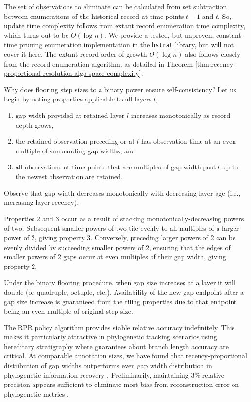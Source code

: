The set of observations to eliminate can be calculated from set subtraction between enumerations of the historical record at time points $t-1$ and $t$.
So, update time complexity follows from extant record enumeration time complexity, which turns out to be $O(\log n)$.
We provide a tested, but unproven, constant-time pruning enumeration implementation in the \texttt{hstrat} library, but will not cover it here. %
The extant record order of growth $O(\log n)$ also follows closely from the record enumeration algorithm, as detailed in Theorem \ref{thm:recency-proportional-resolution-algo-space-complexity}.


Why does flooring step sizes to a binary power ensure self-consistency?
Let us begin by noting properties applicable to all layers $l$,
\begin{enumerate}
\item gap width provided at retained layer $l$ increases monotonically as record depth grows,
\item the retained observation preceding or at $l$ has observation time at an even multiple of surrounding gap widths, and
\item all observations at time points that are multiples of gap width past $l$ up to the newest observation are retained.
\end{enumerate}
Observe that gap width decreases monotonically with decreasing layer age (i.e., increasing layer recency).

Properties 2 and 3 occur as a result of stacking monotonically-decreasing powers of two.
Subsequent smaller powers of two tile evenly to all multiples of a larger power of 2, giving property 3.
Conversely, preceding larger powers of 2 can be evenly divided by succeeding smaller powers of 2, ensuring that the edges of smaller powers of 2 gaps occur at even multiples of their gap width, giving property 2.

Under the binary flooring procedure, when gap size increases at a layer it will double (or quadruple, octuple, etc.).
Availability of the new gap endpoint after a gap size increase is guaranteed from the tiling properties due to that endpoint being an even multiple of original step size.

The RPR policy algorithm provides stable relative accuracy indefinitely.
This makes it particularly attractive in phylogenetic tracking scenarios using hereditary stratigraphy where guarantees about branch length accuracy are critical.
At comparable annotation sizes, we have found that recency-proportional distribution of gap widths outperforms even gap width distribution in phylogenetic information recovery \citep{moreno2022hereditary}.
Preliminarily, maintaining 3\% relative precision appears sufficient to eliminate most bias from reconstruction error on phylogenetic metrics \citep{moreno2023toward}.

